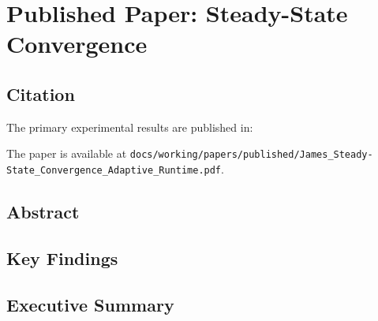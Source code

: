 
\chapter{Published Paper: Steady-State Convergence}
\label{vol3:chap:ssrn}


\section{Citation}
\label{vol3:sec:ssrn:cite}

The primary experimental results are published in:

\begin{quote}
  \cite{james:2025:ssrn}
\end{quote}

The paper is available at \texttt{docs/working/papers/published/James\_Steady-State\_Convergence\_Adaptive\_Runtime.pdf}.

\section{Abstract}
\label{vol3:sec:ssrn:abstract}


\section{Key Findings}
\label{vol3:sec:ssrn:findings}


\section{Executive Summary}
\label{vol3:sec:ssrn:executive}

